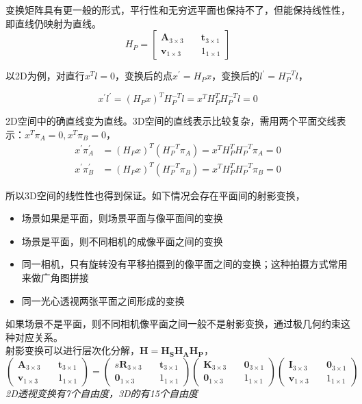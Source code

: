 \documentclass[hpyerref,UTF8,a4paper,titlepage,12pt,oneside]{ctexbook}
\theoremstyle{definition}
\begin{document}
		变换矩阵具有更一般的形式，平行性和无穷远平面也保持不了，但能保持线性性，即直线仍映射为直线。
		$$
			H_P = \begin{bmatrix}
				\mathbf{A}_{3\times 3}\quad& \mathbf{t}_{3\times 1}\\
				\mathbf{v}_{1\times 3} \quad& 1_{1\times 1}
			\end{bmatrix}
		$$

		以2D为例，对直行$x^Tl = 0$，变换后的点$x^\prime = H_Px$，变换后的$l^\prime = H_P^{-T}l$，

		$$
			x^\prime l^\prime = \left(H_Px\right)^TH_P^{-T}l = x^T H_P^TH_P^{-T}l = 0
		$$

		2D空间中的确直线变为直线。3D空间的直线表示比较复杂，需用两个平面交线表示：$x^T\pi_A =0,  x^T\pi_B =0$，
		\begin{align*}		
			x^\prime \pi_A^{\prime} &= (H_Px)^T(H_P^{-T}\pi_A) = x^TH_P^TH_P^{-T}\pi_A = 0\\
			x^\prime \pi_B^{\prime} &= (H_Px)^T(H_P^{-T}\pi_B) = x^TH_P^TH_P^{-T}\pi_B = 0
		\end{align*}

		所以3D空间的线性性也得到保证。如下情况会存在平面间的射影变换，

		\begin{itemize}
			\item 场景如果是平面，则场景平面与像平面间的变换
			\item 场景是平面，则不同相机的成像平面之间的变换
			\item 同一相机，只有旋转没有平移拍摄到的像平面之间的变换；这种拍摄方式常用来做广角图拼接
			\item 同一光心透视两张平面之间形成的变换
		\end{itemize}

		如果场景不是平面，则不同相机像平面之间一般不是射影变换，通过极几何约束这种对应关系。\\

		射影变换可以进行层次化分解，$\mathbf{H} = \mathbf{H_S}\mathbf{H_A}\mathbf{H_P}$，
		$$
			\begin{pmatrix}
				\mathbf{A}_{3\times 3}\quad& \mathbf{t}_{3\times 1}\\
				\mathbf{v}_{1\times 3} \quad& 1_{1\times 1}
			\end{pmatrix}
			=
			\begin{pmatrix}
				s\mathbf{R}_{3\times 3}\quad & \mathbf{t}_{3\times 1}\\
				\mathbf{0}_{1\times 3}\quad & 1_{1\times 1}
			\end{pmatrix}
			\begin{pmatrix}
				\mathbf{K}_{3\times 3}\quad & \mathbf{0}_{3\times 1}\\
				\mathbf{0}_{1\times 3}\quad & 1_{1\times 1}
			\end{pmatrix}
			\begin{pmatrix}
				\mathbf{I}_{3\times 3}\quad & \mathbf{0}_{3\times 1}\\
				\mathbf{v}_{1\times 3}\quad & 1_{1\times 1}
			\end{pmatrix}
		$$
		\textit{2D透视变换有7个自由度，3D的有15个自由度}
\end{document}
